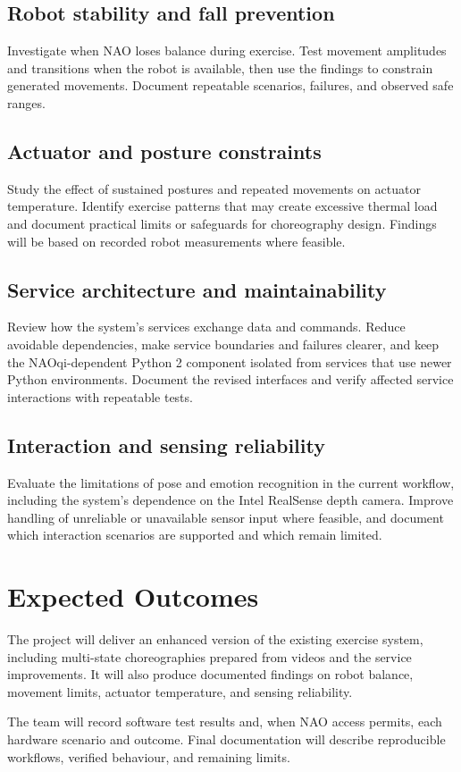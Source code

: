 \documentclass[12pt,a4paper]{article}
\begin{document}
\subsection{Robot stability and fall prevention}

Investigate when NAO loses balance during exercise. Test movement amplitudes and transitions when the robot is available, then use the findings to constrain generated movements. Document repeatable scenarios, failures, and observed safe ranges.

\subsection{Actuator and posture constraints}

Study the effect of sustained postures and repeated movements on actuator temperature. Identify exercise patterns that may create excessive thermal load and document practical limits or safeguards for choreography design. Findings will be based on recorded robot measurements where feasible.

\subsection{Service architecture and maintainability}

Review how the system's services exchange data and commands. Reduce avoidable dependencies, make service boundaries and failures clearer, and keep the NAOqi-dependent Python 2 component isolated from services that use newer Python environments. Document the revised interfaces and verify affected service interactions with repeatable tests.

\subsection{Interaction and sensing reliability}

Evaluate the limitations of pose and emotion recognition in the current workflow, including the system's dependence on the Intel RealSense depth camera. Improve handling of unreliable or unavailable sensor input where feasible, and document which interaction scenarios are supported and which remain limited.

\section{Expected Outcomes}

The project will deliver an enhanced version of the existing exercise system, including multi-state choreographies prepared from videos and the service improvements. It will also produce documented findings on robot balance, movement limits, actuator temperature, and sensing reliability.

The team will record software test results and, when NAO access permits, each hardware scenario and outcome. Final documentation will describe reproducible workflows, verified behaviour, and remaining limits.
\end{document}
